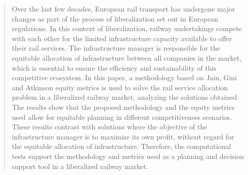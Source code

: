 \documentclass[preprint,12pt]{elsarticle}
\begin{document}
\begin{frontmatter}
\begin{abstract}
Over the last few decades, European rail transport has undergone major changes as part of the process of liberalization set out in European regulations. In this context of liberalization, railway undertakings compete with each other for the limited infrastructure capacity available to offer their rail services. The infrastructure manager is responsible for the equitable allocation of infrastructure between all companies in the market, which is essential to ensure the efficiency and sustainability of this competitive ecosystem. In this paper, a methodology based on Jain, Gini and Atkinson equity metrics is used to solve the rail service allocation problem in a liberalized railway market, analyzing the solutions obtained. The results show that the proposed methodology and the equity metrics used allow for equitable planning in different competitiveness scenarios. These results contrast with solutions where the objective of the infrastructure manager is to maximize its own profit, without regard for the equitable allocation of infrastructure. Therefore, the computational tests support the methodology and metrics used as a planning and decision support tool in a liberalized railway market.
\end{abstract}








\end{frontmatter}
\end{document}
